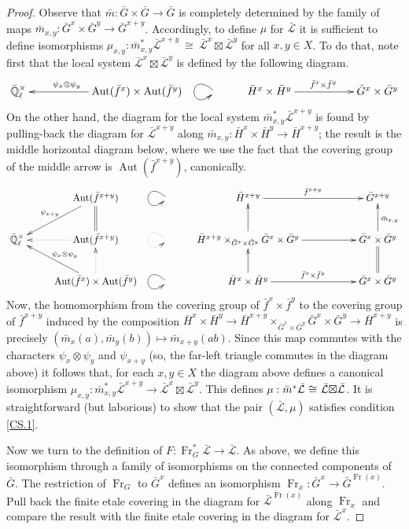 \documentclass[11pt]{amsart}
\theoremstyle{plain}
\theoremstyle{definition}
\theoremstyle{remark}
\newcommand{\EE}{\mathbb{\bar Q}_\ell}
\newcommand{\EEx}{\EE^\times}
\newcommand{\Frob}{{\operatorname{Fr}}}
\DeclareMathOperator{\Aut}{Aut}
\newcommand{\iso}{{\ \cong\ }}
\newcommand{\gcs}[1]{{\mathcal{\bar #1}}}
\newcommand{\tighterboxtimes}{\hspace{-2pt}\boxtimes\hspace{-2pt}}
\renewcommand{\bf}{\bar{f}}
\newcommand{\bm}{\bar{m}}
\newcommand{\bG}{\bar{G}}
\newcommand{\bH}{\bar{H}}
\newcommand{\LxL}{\gcs{L} \tighterboxtimes \gcs{L}}
\begin{document}
\begin{proof}
  Observe that $\bm: \bG\times \bG\to \bG$ is
  completely determined by the family of maps
  $\bm_{x,y} : \bG^x \times \bG^{y} \to \bG^{x+y}$.
  Accordingly, to define $\mu$ for $\gcs{L}$ it is sufficient to define isomorphisms
  $\mu_{x,y} : \bm_{x,y}^*\gcs{L}^{x+y} \iso \gcs{L}^{x}\boxtimes \gcs{L}^{y}$
  for all $x,y\in X$. To do that, note first that the local system
  $\gcs{L}^{x}\boxtimes \gcs{L}^{y}$ is defined by the following diagram.
  \[
  \xymatrix{
    \EEx && \ar[ll]_{\hskip-20pt \psi_x\otimes \psi_y} \Aut(\bf^x)\times \Aut(\bf^y)
    & \ar@(ul,dl) & \bH^x\times \bH^y \ar[rr]^{\bf^x\times \bf^y} && \bG^x\times \bG^y\\
    }
  \]
  On the other hand, the diagram for the local system $\bm_{x,y}^* \gcs{L}^{x+y}$
  is found by pulling-back the diagram for $\gcs{L}^{x+y}$ along
  $\bm_{x,y} : \bH^x\times\bH^y \to \bH^{x+y}$;
  the result is the middle horizontal diagram below, where we use the
  fact that the covering group of the middle arrow is $\Aut(\bf^{x+y})$, canonically.
  \[
  \xymatrix{
    & \ar[dl]_{\psi_{x+y}} \Aut(\bf^{x+y})
    & \ar@(ul,dl) & \bH^{x+y} \ar[rr]^{\bf^{x+y}} && \bG^{x+y}\\
    \EEx & \ar@{.>}[l] \Aut(\bf^{x+y})  \ar@{=}[u] &  \ar@{.>}@(ul,dl)
    & \ar[u] \bH^{x+y} \times_{\bG^x\times\bG^y} \bG^x\times\bG^y \ar[rr]
    && \ar[u]_{\bm_{x,y}} \bG^x\times \bG^y\\
    & \ar[lu]_{\psi_x\otimes \psi_y} \ar@{.>}[u] \Aut(\bf^x)\times \Aut(\bf^y)
    & \ar@(ul,dl) & \ar[u] \bH^x\times \bH^y \ar[rr]^{\bf^x\times \bf^y}
    && \ar@{=}[u] \bG^x\times \bG^y\\
    }
  \]
  Now, the homomorphism from the covering group of
  $\bf^x\times\bf^y$ to the covering group of
  $\bf^{x+y}$ induced by the composition
  $ \bH^x\times \bH^y \to \bH^{x+y} \times_{\bG^x\times\bG^y} \bG^x\times\bG^y \to \bH^{x+y}$
  is precisely $(\bm_x(a),\bm_y(b)) \mapsto \bm_{x+y}(ab)$.
  Since this map commutes with the characters $\psi_x\otimes\psi_y$
  and $\psi_{x+y}$ (so, the far-left triangle commutes in the diagram above)
  it follows that, for each $x,y\in X$ the diagram above defines a canonical isomorphism
  $\mu_{x,y} : \bm_{x,y}^* \gcs{L}^{x+y} \to \gcs{L}^x \boxtimes\gcs{L}^y$.
  This defines $\mu: \bm^* \gcs{L} \iso \LxL$.
  It is straightforward (but laborious) to show that the pair
  $(\gcs{L},\mu)$ satisfies condition \ref{CS.1}.

  Now we turn to the definition of $F : \Frob_{G}^* \gcs{L} \to \gcs{L}$.
  As above, we define this isomorphism through a family of
  isomorphisms on the connected components of $\bG$. The
  restriction of $\Frob_{G}$ to $\bG^x$ defines an isomorphism
  $\Frob_x : \bG^x \to \bG^{\Frob(x)}$.
  Pull back the finite etale covering in the diagram for
  $\gcs{L}^{\Frob(x)}$ along $\Frob_x$ and compare the result with the
  finite etale covering in the diagram for $\gcs{L}^{x}$.


\end{proof}
\end{document}
